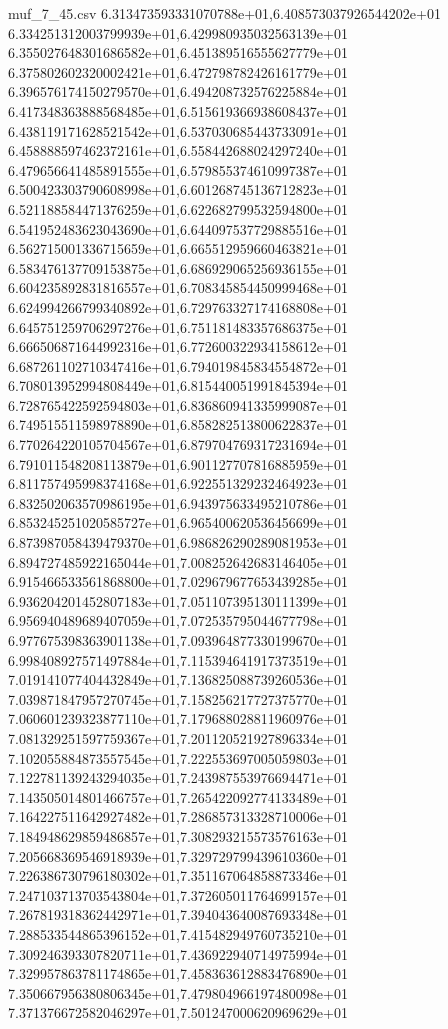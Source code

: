 \begin{filecontents*}{muf_7_45.csv}
6.313473593331070788e+01,6.408573037926544202e+01
6.334251312003799939e+01,6.429980935032563139e+01
6.355027648301686582e+01,6.451389516555627779e+01
6.375802602320002421e+01,6.472798782426161779e+01
6.396576174150279570e+01,6.494208732576225884e+01
6.417348363888568485e+01,6.515619366938608437e+01
6.438119171628521542e+01,6.537030685443733091e+01
6.458888597462372161e+01,6.558442688024297240e+01
6.479656641485891555e+01,6.579855374610997387e+01
6.500423303790608998e+01,6.601268745136712823e+01
6.521188584471376259e+01,6.622682799532594800e+01
6.541952483623043690e+01,6.644097537729885516e+01
6.562715001336715659e+01,6.665512959660463821e+01
6.583476137709153875e+01,6.686929065256936155e+01
6.604235892831816557e+01,6.708345854450999468e+01
6.624994266799340892e+01,6.729763327174168808e+01
6.645751259706297276e+01,6.751181483357686375e+01
6.666506871644992316e+01,6.772600322934158612e+01
6.687261102710347416e+01,6.794019845834554872e+01
6.708013952994808449e+01,6.815440051991845394e+01
6.728765422592594803e+01,6.836860941335999087e+01
6.749515511598978890e+01,6.858282513800622837e+01
6.770264220105704567e+01,6.879704769317231694e+01
6.791011548208113879e+01,6.901127707816885959e+01
6.811757495998374168e+01,6.922551329232464923e+01
6.832502063570986195e+01,6.943975633495210786e+01
6.853245251020585727e+01,6.965400620536456699e+01
6.873987058439479370e+01,6.986826290289081953e+01
6.894727485922165044e+01,7.008252642683146405e+01
6.915466533561868800e+01,7.029679677653439285e+01
6.936204201452807183e+01,7.051107395130111399e+01
6.956940489689407059e+01,7.072535795044677798e+01
6.977675398363901138e+01,7.093964877330199670e+01
6.998408927571497884e+01,7.115394641917373519e+01
7.019141077404432849e+01,7.136825088739260536e+01
7.039871847957270745e+01,7.158256217727375770e+01
7.060601239323877110e+01,7.179688028811960976e+01
7.081329251597759367e+01,7.201120521927896334e+01
7.102055884873557545e+01,7.222553697005059803e+01
7.122781139243294035e+01,7.243987553976694471e+01
7.143505014801466757e+01,7.265422092774133489e+01
7.164227511642927482e+01,7.286857313328710006e+01
7.184948629859486857e+01,7.308293215573576163e+01
7.205668369546918939e+01,7.329729799439610360e+01
7.226386730796180302e+01,7.351167064858873346e+01
7.247103713703543804e+01,7.372605011764699157e+01
7.267819318362442971e+01,7.394043640087693348e+01
7.288533544865396152e+01,7.415482949760735210e+01
7.309246393307820711e+01,7.436922940714975994e+01
7.329957863781174865e+01,7.458363612883476890e+01
7.350667956380806345e+01,7.479804966197480098e+01
7.371376672582046297e+01,7.501247000620969629e+01

\end{filecontents*}
